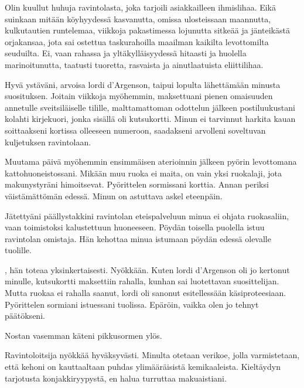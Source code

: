 \indent{}Olin kuullut huhuja ravintolasta, joka tarjoili asiakkailleen ihmislihaa. Eik\"{a} suinkaan mit\"{a}\"{a}n k\"{o}yhyydess\"{a} kasvanutta, omissa ulosteissaan maannutta, kulkutautien runtelemaa, viikkoja pakastimessa lojunutta sitke\"{a}\"{a} ja j\"{a}nteik\"{a}st\"{a} orjakansaa, jota sai ostettua taskurahoilla maailman kaikilta levottomilta seuduilta. Ei, vaan rahassa ja ylt\"{a}kyll\"{a}isyydess\"{a} hitaasti ja huolella marinoitunutta, taatusti tuoretta, rasvaista ja ainutlaatuista eliittilihaa.

\indent{}Hyv\"{a} yst\"{a}v\"{a}ni, arvoisa lordi d'Argenson, taipui lopulta l\"{a}hett\"{a}m\"{a}\"{a}n minusta suosituksen. Joitain viikkoja my\"{o}hemmin, maksettuani pienen omaisuuden annetulle sveitsil\"{a}iselle tilille, malttamattoman odottelun j\"{a}lkeen postiluukustani kolahti kirjekuori, jonka sis\"{a}ll\"{a} oli kutsukortti. Minun ei tarvinnut harkita kauan soittaakseni kortissa olleeseen numeroon, saadakseni arvolleni soveltuvan kuljetuksen ravintolaan.



\subchapter{}\noindent{}Muutama p\"{a}iv\"{a} my\"{o}hemmin ensimm\"{a}isen aterioinnin j\"{a}lkeen py\"{o}rin levottomana kattohuoneistossani. Mik\"{a}\"{a}n muu ruoka ei maita, on vain yksi ruokalaji, jota makunystyr\"{a}ni himoitsevat. Py\"{o}rittelen sormissani korttia. Annan periksi v\"{a}ist\"{a}m\"{a}tt\"{o}m\"{a}n edess\"{a}. Minun on astuttava askel eteenp\"{a}in.

\indent{}J\"{a}tetty\"{a}ni p\"{a}\"{a}llystakkini ravintolan eteispalveluun minua ei ohjata ruokasaliin, vaan toimistoksi kalustettuun huoneeseen. P\"{o}yd\"{a}n toisella puolella istuu ravintolan omistaja. H\"{a}n kehottaa minua istumaan p\"{o}yd\"{a}n edess\"{a} olevalle tuolille.

\indent{}, h\"{a}n toteaa yksinkertaisesti. Ny\"{o}kk\"{a}\"{a}n. Kuten lordi d'Argenson oli jo kertonut minulle, kutsukortti maksettiin rahalla, kunhan sai luotettavan suosittelijan. Mutta ruokaa ei rahalla saanut, lordi oli sanonut esitelless\"{a}\"{a}n k\"{a}siproteesiaan. Py\"{o}rittelen sormiani istuessani tuolissa. Ep\"{a}r\"{o}in, vaikka olen jo tehnyt p\"{a}\"{a}t\"{o}kseni.

\indent{}Nostan vasemman k\"{a}teni pikkusormen yl\"{o}s.

\indent{}Ravintoloitsija ny\"{o}kk\"{a}\"{a} hyv\"{a}ksyv\"{a}sti. Minulta otetaan verikoe, jolla varmistetaan, ett\"{a} kehoni on kauttaaltaan puhdas ylim\"{a}\"{a}r\"{a}isist\"{a} kemikaaleista. Kielt\"{a}ydyn tarjotusta konjakkiryypyst\"{a}, en halua turruttaa makuaistiani.

